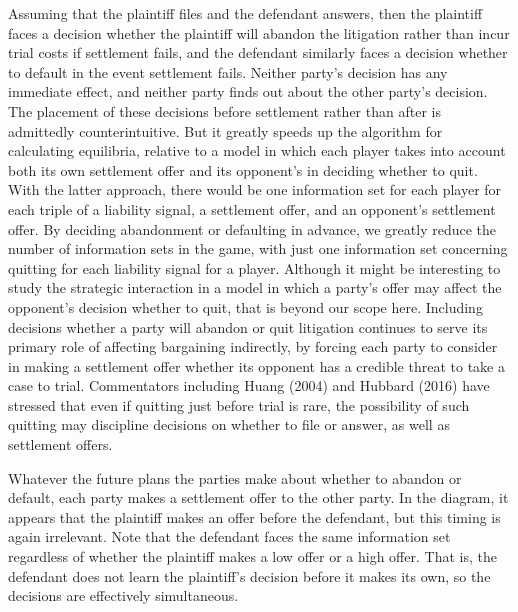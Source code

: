\documentclass{article}
\begin{document}
Assuming that the plaintiff files and the defendant answers, then the plaintiff faces a decision whether the plaintiff will abandon the litigation rather than incur trial costs if settlement fails, and the defendant similarly faces a decision whether to default in the event settlement fails. Neither party's decision has any immediate effect, and neither party finds out about the other party's decision. The placement of these decisions before settlement rather than after is admittedly counterintuitive. But it greatly speeds up the algorithm for calculating equilibria, relative to a model in which each player takes into account both its own settlement offer and its opponent's in deciding whether to quit. With the latter approach, there would be one information set for each player for each triple of a liability signal, a settlement offer, and an opponent's settlement offer. By deciding abandonment or defaulting in advance, we greatly reduce the number of information sets in the game, with just one information set concerning quitting for each liability signal for a player. Although it might be interesting to study the strategic interaction in a model in which a party's offer may affect the opponent's decision whether to quit, that is beyond our scope here. Including decisions whether a party will abandon or quit litigation continues to serve its primary role of affecting bargaining indirectly, by forcing each party to consider in making a settlement offer whether its opponent has a credible threat to take a case to trial. Commentators including Huang (2004) \cite{huang} and Hubbard (2016) \cite{hubbard} have stressed that even if quitting just before trial is rare, the possibility of such quitting may discipline decisions on whether to file or answer, as well as settlement offers.

Whatever the future plans the parties make about whether to abandon or default, each party makes a settlement offer to the other party. In the diagram, it appears that the plaintiff makes an offer before the defendant, but this timing is again irrelevant. Note that the defendant faces the same information set regardless of whether the plaintiff makes a low offer or a high offer. That is, the defendant does not learn the plaintiff's decision before it makes its own, so the decisions are effectively simultaneous. 
\end{document}
